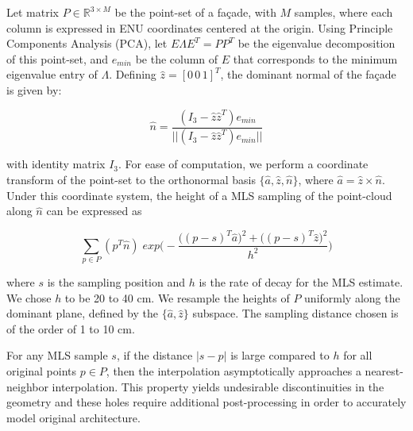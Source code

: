 \documentclass{article}
\begin{document}
Let matrix $P \in \mathbb{R} ^{3 \times M}$ be the point-set of a fa\c{c}ade, with $M$ samples, where each column is expressed in ENU coordinates centered at the origin.  Using Principle Components Analysis (PCA), let $ E \Lambda E^T = PP^T $ be the eigenvalue decomposition of this point-set, and $e_{min}$ be the column of $E$ that corresponds to the minimum eigenvalue entry of $\Lambda$.  Defining $\hat{z} = [0\,0\,1]^T$, the dominant normal of the fa\c{c}ade is given by:

\begin{equation}
\hat{n} = \dfrac{( I_3 - \hat{z} \hat{z}^T ) e_{min} } {|| (I_3 - \hat{z} \hat{z}^T) e_{min} ||}
\end{equation}

with identity matrix $I_3$.  For ease of computation, we perform a coordinate transform of the point-set to the orthonormal basis $\{ \hat{a}, \hat{z}, \hat{n} \}$, where $\hat{a} = \hat{z} \times \hat{n}$.  Under this coordinate system, the height of a MLS sampling of the point-cloud along $\hat{n}$ can be expressed as

\begin{equation}
\sum_{p \in P} (p^T \hat{n}) \; exp\Big( - \dfrac{\big( (p-s)^T \hat{a} \big)^2 + \big( (p-s)^T \hat{z} \big)^2 }{h^2} \Big)
\end{equation}

where $s$ is the sampling position and $h$ is the rate of decay for the MLS estimate.  We chose $h$ to be 20 to 40 cm.  We resample the heights of $P$ uniformly along the dominant plane, defined by the $\{\hat{a},\hat{z}\}$ subspace. The sampling distance chosen is of the order of 1 to 10 cm.

For any MLS sample $s$, if the distance $|s-p|$ is large compared to $h$ for all original points $p \in P$, then the interpolation asymptotically approaches a nearest-neighbor interpolation.  This property yields undesirable discontinuities in the geometry and these holes require additional post-processing in order to accurately model original architecture.


%
%
\end{document}
